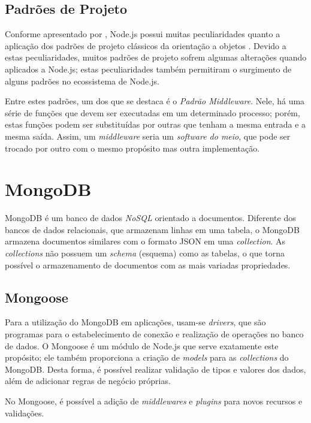 
\subsection{Padrões de Projeto}
\label{node:design}

Conforme apresentado por , Node.js possui muitas peculiaridades quanto a aplicação dos padrões de projeto clássicos da orientação a objetos \cite{GAMMA:1995}. Devido a estas peculiaridades, muitos padrões de projeto sofrem algumas alterações quando aplicados a Node.js; estas peculiaridades também permitiram o surgimento de alguns padrões no ecossistema de Node.js.

Entre estes padrões, um dos que se destaca é o \textit{Padrão Middleware}. Nele, há uma série de funções que devem ser executadas em um determinado processo; porém, estas funções podem ser substituídas por outras que tenham a mesma entrada e a mesma saída. Assim, um \textit{middleware} seria um \textit{software do meio}, que pode ser trocado por outro com o mesmo propósito mas outra implementação.


\section{MongoDB}

MongoDB \cite{MONGODB} é um banco de dados \textit{NoSQL} \cite{NOSQLORG} orientado a documentos. Diferente dos bancos de dados relacionais, que armazenam linhas em uma tabela, o MongoDB armazena documentos similares com o formato JSON em uma \textit{collection}. As \textit{collections} não possuem um \textit{schema} (esquema) como as tabelas, o que torna possível o armazenamento de documentos com as mais variadas propriedades.


\subsection{Mongoose}

Para a utilização do MongoDB em aplicações, usam-se \textit{drivers}, que são programas para o estabelecimento de conexão e realização de operações no banco de dados. O Mongoose é um módulo de Node.js que serve exatamente este propósito; ele também proporciona a criação de \textit{models} para as \textit{collections} do MongoDB. Desta forma, é possível realizar validação de tipos e valores dos dados, além de adicionar regras de negócio próprias.

No Mongoose, é possível a adição de \textit{middlewares} e \textit{plugins} para novos recursos e validações.

